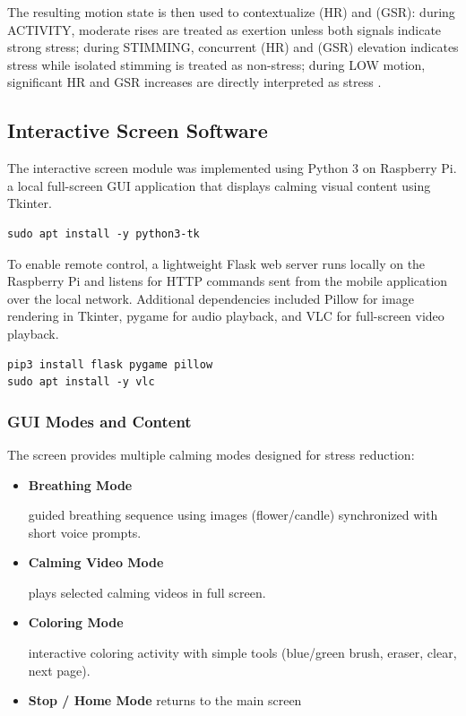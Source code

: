\documentclass[a4paper,12pt]{report}
\begin{document}
The resulting motion state is then used to contextualize (HR) and (GSR): during ACTIVITY, moderate rises are treated as exertion unless both signals indicate strong stress; during STIMMING, concurrent (HR) and (GSR) elevation indicates stress while isolated stimming is treated as non-stress; during LOW motion, significant HR and GSR increases are directly interpreted as stress \cite{pmc_stress_monitoring_2010}.


\subsection{Interactive Screen Software}
The interactive screen module was implemented using Python 3 on Raspberry Pi. a local full-screen GUI application that displays calming visual content using Tkinter.

\begin{lstlisting}
sudo apt install -y python3-tk
\end{lstlisting}
To enable remote control, a lightweight Flask web server runs locally on the Raspberry Pi and listens for HTTP commands sent from the mobile application over the local network. Additional dependencies included Pillow for image rendering in Tkinter, pygame for audio playback, and VLC for full-screen video playback.
\begin{lstlisting}
pip3 install flask pygame pillow
sudo apt install -y vlc
\end{lstlisting}

\subsubsection{GUI Modes and Content}
The screen provides multiple calming modes designed for stress reduction:
\begin{itemize}
    \item \textbf{Breathing Mode}

    guided breathing sequence using images (flower/candle) synchronized with short voice prompts.
    \item \textbf{Calming Video Mode}

    plays selected calming videos in full screen.
    \item \textbf{Coloring Mode}

    interactive coloring activity with simple tools (blue/green brush, eraser, clear, next page).
    \item \textbf{Stop / Home Mode}
    returns to the main screen
\end{itemize}
\end{document}
